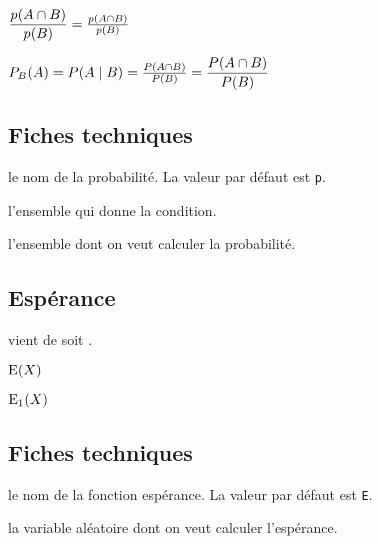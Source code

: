 \documentclass[12pt,a4paper]{article}
\begin{document}
\begin{latexex}
 $\probacondexp {B}{A}
= \probacondexp*{B}{A}$
\end{latexex}





\begin{latexex}
 $\probacond    [P]{B}{A}
= \probacond*   [P]{B}{A}
= \probacondexp*[P]{B}{A}
= \probacondexp [P]{B}{A}$
\end{latexex}




\subsection{Fiches techniques}



\extraspace




\IDoption{} le nom de la probabilité. La valeur par défaut est \verb+p+.

 l'ensemble qui donne la condition.

 l'ensemble dont on veut calculer la probabilité.




\subsection{Espérance}

\newparaexample{}

 vient de   soit .
\begin{latexex}
$\expval{X}$
\end{latexex}





\begin{latexex}
$\expval[E_1]{X}$
\end{latexex}




\subsection{Fiches techniques}


\IDoption{} le nom de la fonction espérance. La valeur par défaut est \verb+E+.

\IDarg{} la variable aléatoire dont on veut calculer l'espérance.
\end{document}
